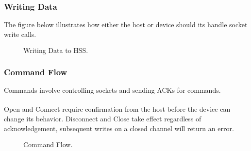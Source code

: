 \documentclass[10pt]{article}
\begin{document}
	\subsubsection{Writing Data}
	The figure below illustrates how either the host or device should its handle socket write calls. 
	\begin{figure}[H]
	\begin{center}
		\caption[Writing Data to HSS.]{Writing Data to HSS.}
		\resizebox{\linewidth}{!}{}
	\end{center}
	\end{figure}

\subsubsection{Command Flow}
Commands involve controlling sockets and sending ACKs for commands. \\
\\
Open and Connect require confirmation from the host before the device can change its behavior. Disconnect and Close take effect regardless of acknowledgement, subsequent writes on a closed channel will return an error.
\begin{figure}[H]
	\begin{center}
		\caption[Command Flow.]{Command Flow.}
		\resizebox{\linewidth}{!}{}
	\end{center}
\end{figure}
\end{document}

